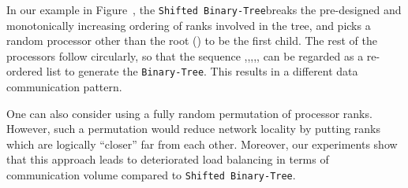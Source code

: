 \documentclass{acm_proc_article-sp}
\newcommand{\btree}{\texttt{Binary-Tree}\xspace}
\newcommand{\modbtree}{\texttt{Shifted Binary-Tree}\xspace}
\begin{document}
In our example in Figure~, the
\modbtree \linebreak breaks the pre-designed and monotonically increasing ordering 
of ranks involved in the tree,
and picks a random processor
other than the root () to be the first child.  The rest of the
processors follow circularly, so that the sequence
,,,,, can be regarded as a re-ordered
list to generate the \btree. 
This results in a different data communication pattern.

One can also consider using a fully random permutation of processor ranks. However,
such a permutation would reduce network locality by putting ranks which are logically
``closer'' far from each other. Moreover, our experiments show that this
approach leads to deteriorated load balancing in terms of communication
volume compared to \modbtree.
\end{document}
